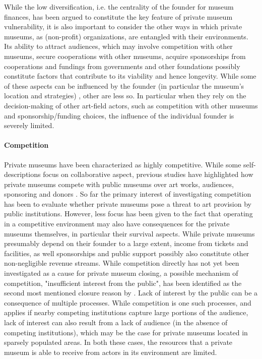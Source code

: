 \documentclass[12pt]{article}
\begin{document}
While the low diversification, i.e. the centrality of the founder for museum finances, has been argued to constitute the key feature of private museum vulnerability, it is also important to consider the other ways in which private museums, as (non-profit) organizations, are entangled with their environments.
Its ability to attract audiences, which may involve competition with other museums, secure cooperations with other museums, acquire sponsorships from cooperations and fundings from governments and other foundations possibly constitute factors that contribute to its viability and hence longevity.
While some of these aspects can be influenced by the founder (in particular the museum's location and strategies) , other are less so.
In particular when they rely on the decision-making of other art-field actors, such as competition with other museums and sponsorship/funding choices, the influence of the individual founder is severely limited.
\paragraph*{Competition}




Private museums have been characterized as highly competitive.
While some self-descriptions focus on collaborative aspect, previous studies have highlighted how private museums compete with public museums over art works, audiences, sponsoring and donors \parencite[p.4]{Kolbe_etal_2022_privatemuseum}. 
So far the primary interest of investigating competition has been to evaluate whether private museums pose a threat to art provision by public institutions.
However, less focus has been given to the fact that operating in a competitive environment may also have consequences for the private museums themselves, in particular their survival aspects.
While private museums presumably depend on their founder to a large extent, income from tickets and facilities, as well sponsorships and public support possibly also constitute other non-negligible revenue streams.
While competition directly has not yet been investigated as a cause for private museum closing, a possible mechanism of competition, "insufficient interest from the public", has been identified as the second most mentioned closure reason by \textcite[p.6]{Velthuis_Gera_2024_fragility}. 
Lack of interest by the public can be a consequence of multiple processes.
While competition is one such processes, and applies if nearby competing institutions capture large portions of the audience, lack of interest can also result from a lack of audience (in the absence of competing institutions), which may be the case for private museums located in sparsely populated areas.
In both these cases, the resources that a private museum is able to receive from actors in its environment are limited. 
\end{document}
